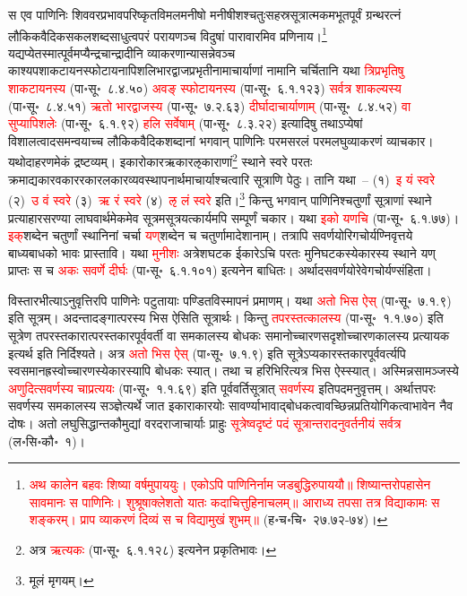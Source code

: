 \begin{sloppypar}\justifying\noindent\hspace{10mm} स एव पाणिनिः शिव\-वर\-प्रभाव\-परिष्कृत\-विमल\-मनीषो मनीषीशश्चतुः\-सहस्र\-सूत्रात्मकमभूतपूर्वं ग्रन्थ\-रत्नं लौकिक\-वैदिक\-सकल\-शब्द\-साधुत्व\-परं परायणञ्च विदुषां पारावारमिव प्रणिनाय।\footnote{\textcolor{red}{अथ कालेन बहवः शिष्या वर्षमुपाययुः। एकोऽपि पाणिनिर्नाम जडबुद्धिरुपाययौ॥ शिष्यान्तरोपहासेन सावमानः स पाणिनिः। शुश्रूषाक्लेशतो यातः कदाचित्तुहिनाचलम्॥ आराध्य तपसा तत्र विद्याकामः स शङ्करम्। प्राप व्याकरणं दिव्यं स च विद्यामुखं शुभम्॥} (ह॰च॰चि॰~२७.७२-७४)।} यद्यप्येतस्मात्पूर्वमप्यैन्द्र\-चान्द्रादीनि व्याकरणान्यासन्नेवञ्च काश्यप\-शाकटायन\-स्फोटायनापिशलि\-भारद्वाज\-प्रभृतीनामाचार्याणां नामानि चर्चितानि यथा \textcolor{red}{त्रिप्रभृतिषु शाकटायनस्य} (पा॰सू॰~८.४.५०) \textcolor{red}{अवङ् स्फोटायनस्य} (पा॰सू॰~६.१.१२३) \textcolor{red}{सर्वत्र शाकल्यस्य} (पा॰सू॰~८.४.५१) \textcolor{red}{ऋतो भारद्वाजस्य} (पा॰सू॰~७.२.६३) \textcolor{red}{दीर्घादाचार्याणाम्} (पा॰सू॰~८.४.५२) \textcolor{red}{वा सुप्यापिशलेः} (पा॰सू॰~६.१.९२) \textcolor{red}{हलि सर्वेषाम्} (पा॰सू॰~८.३.२२) इत्यादिषु तथाऽप्येषां विशालत्वादसमन्वयाच्च लौकिक\-वैदिक\-शब्दानां भगवान् पाणिनिः परम\-सरलं परम\-लघु\-व्याकरणं व्याचकार। यथोदाहरणमेकं द्रष्टव्यम्। इकारोकार\-ऋकार\-ऌकाराणां\footnote{अत्र \textcolor{red}{ऋत्यकः} (पा॰सू॰~६.१.१२८) इत्यनेन प्रकृतिभावः।} स्थाने स्वरे परतः क्रमाद्यकार\-वकार\-रकार\-लकार\-व्यवस्थापनार्थमाचार्याश्चत्वारि सूत्राणि पेठुः। तानि यथा~– (१)~\textcolor{red}{इ यं स्वरे} (२)~\textcolor{red}{उ वं स्वरे} (३)~\textcolor{red}{ऋ रं स्वरे} (४)~\textcolor{red}{ऌ लं स्वरे} इति।\footnote{मूलं मृगयम्।} किन्तु भगवान् पाणिनिश्चतुर्णां सूत्राणां स्थाने प्रत्याहार\-सरण्या लाघवार्थमेकमेव सूत्रमसूत्रयत्कार्यमपि सम्पूर्णं चकार। यथा \textcolor{red}{इको यणचि} (पा॰सू॰~६.१.७७)। \textcolor{red}{इक्‌}\-शब्देन चतुर्णां स्थानिनां चर्चा \textcolor{red}{यण्‌}\-शब्देन च चतुर्णामादेशानाम्। तत्रापि सवर्णयोरिगचोर्यण्निवृत्तये बाध्य\-बाधको भावः प्रास्तावि। यथा \textcolor{red}{मुनीशः} अत्रेश\-घटक ईकारेऽचि परतः मुनि\-घटकस्येकारस्य स्थाने यण् प्राप्तः स च \textcolor{red}{अकः सवर्णे दीर्घः} (पा॰सू॰~६.१.१०१) इत्यनेन बाधितः। अर्थादसवर्णयोरेवेगचोर्यण्संहिता।\end{sloppypar}
\begin{sloppypar}\justifying\noindent\hspace{10mm} विस्तार\-भीत्याऽनुवृत्तिरपि पाणिनेः पटुतायाः पण्डित\-विस्मापनं प्रमाणम्। यथा \textcolor{red}{अतो भिस ऐस्} (पा॰सू॰~७.१.९) इति सूत्रम्। अदन्तादङ्गात्परस्य भिस ऐसिति सूत्रार्थः। किन्तु \textcolor{red}{तपरस्तत्कालस्य} (पा॰सू॰~१.१.७०) इति सूत्रेण तपरस्तकारात्परस्तकार\-पूर्व\-वर्ती वा सम\-कालस्य बोधकः समानोच्चारण\-सदृशोच्चारण\-कालस्य प्रत्यायक इत्यर्थ इति निर्दिश्यते। अत्र \textcolor{red}{अतो भिस ऐस्} (पा॰सू॰~७.१.९) इति सूत्रेऽप्यकारस्तकार\-पूर्व\-वर्त्यपि स्व\-समान\-ह्रस्वोच्चारणस्येकारस्यापि बोधकः स्यात्। तथा च हरिभिरित्यत्र भिस ऐस्स्यात्। अस्मिन्नसामञ्जस्ये \textcolor{red}{अणुदित्सवर्णस्य चाप्रत्ययः} (पा॰सू॰~१.१.६९) इति पूर्व\-वर्ति\-सूत्रात् \textcolor{red}{सवर्णस्य} इतिपदमनुवृत्तम्। अर्थात्तपरः सवर्णस्य सम\-कालस्य सञ्ज्ञेत्यर्थे जात इकाराकारयोः सावर्ण्याभावाद्बोधकत्वावच्छिन्न\-प्रतियोगिकत्वाभावेन नैव दोषः। अतो लघु\-सिद्धान्त\-कौमुद्यां वरदराजाचार्याः प्राहुः \textcolor{red}{सूत्रेष्वदृष्टं पदं सूत्रान्तरादनुवर्तनीयं सर्वत्र} (ल॰सि॰कौ॰~१)।\end{sloppypar}

